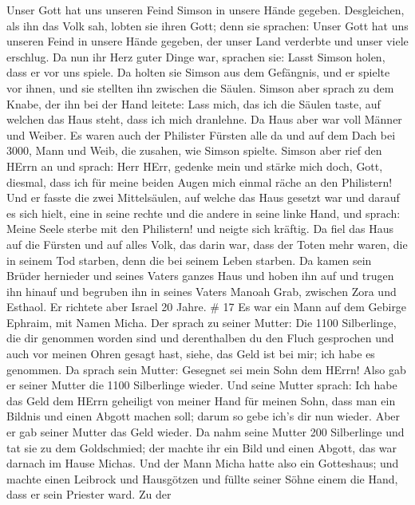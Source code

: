 Unser Gott hat uns unseren Feind Simson in unsere Hände gegeben.
 Desgleichen, als ihn das Volk sah, lobten sie ihren Gott;
denn sie sprachen: Unser Gott hat uns unseren Feind in unsere Hände
gegeben, der unser Land verderbte und unser viele erschlug.
 Da nun ihr Herz guter Dinge war, sprachen sie: Lasst
Simson holen, dass er vor uns spiele. Da holten sie Simson aus dem
Gefängnis, und er spielte vor ihnen, und sie stellten ihn zwischen die
Säulen.  Simson aber sprach zu dem Knabe, der ihn bei der
Hand leitete: Lass mich, das ich die Säulen taste, auf welchen das Haus
steht, dass ich mich dranlehne.  Da Haus aber war voll
Männer und Weiber. Es waren auch der Philister Fürsten alle da und auf
dem Dach bei 3000, Mann und Weib, die zusahen, wie Simson spielte.
 Simson aber rief den HErrn an und sprach: Herr HErr,
gedenke mein und stärke mich doch, Gott, diesmal, dass ich für meine
beiden Augen mich einmal räche an den Philistern!  Und er
fasste die zwei Mittelsäulen, auf welche das Haus gesetzt war und darauf
es sich hielt, eine in seine rechte und die andere in seine linke Hand,
 und sprach: Meine Seele sterbe mit den Philistern! und
neigte sich kräftig. Da fiel das Haus auf die Fürsten und auf alles
Volk, das darin war, dass der Toten mehr waren, die in seinem Tod
starben, denn die bei seinem Leben starben.  Da kamen sein
Brüder hernieder und seines Vaters ganzes Haus und hoben ihn auf und
trugen ihn hinauf und begruben ihn in seines Vaters Manoah Grab,
zwischen Zora und Esthaol. Er richtete aber Israel 20 Jahre. \# 17
 Es war ein Mann auf dem Gebirge Ephraim, mit Namen Micha.
 Der sprach zu seiner Mutter: Die 1100 Silberlinge, die dir
genommen worden sind und derenthalben du den Fluch gesprochen und auch
vor meinen Ohren gesagt hast, siehe, das Geld ist bei mir; ich habe es
genommen. Da sprach sein Mutter: Gesegnet sei mein Sohn dem HErrn!
 Also gab er seiner Mutter die 1100 Silberlinge wieder. Und
seine Mutter sprach: Ich habe das Geld dem HErrn geheiligt von meiner
Hand für meinen Sohn, dass man ein Bildnis und einen Abgott machen soll;
darum so gebe ich's dir nun wieder.  Aber er gab seiner
Mutter das Geld wieder. Da nahm seine Mutter 200 Silberlinge und tat sie
zu dem Goldschmied; der machte ihr ein Bild und einen Abgott, das war
darnach im Hause Michas.  Und der Mann Micha hatte also ein
Gotteshaus; und machte einen Leibrock und Hausgötzen und füllte seiner
Söhne einem die Hand, dass er sein Priester ward.  Zu der
